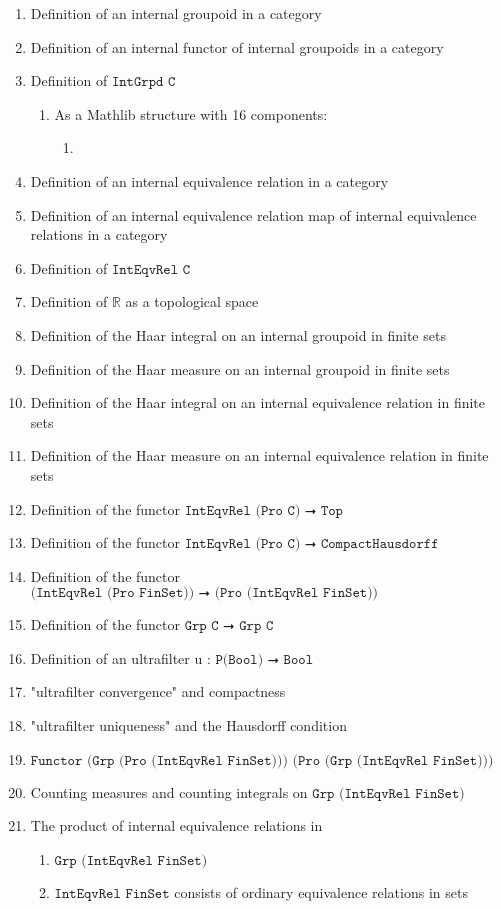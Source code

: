 \documentclass[13pt]{amsart}
\begin{document}
\begin{enumerate}
\item Definition of an internal groupoid in a category
\item Definition of an internal functor of internal groupoids in a category
\item Definition of $\texttt{IntGrpd C}$
\begin{enumerate}
\item As a Mathlib structure with 16 components:
\begin{enumerate}
\item 
\end{enumerate}
\end{enumerate}
\item Definition of an internal equivalence relation in a category
\item Definition of an internal equivalence relation map of internal equivalence relations in a category
\item Definition of $\texttt{IntEqvRel C}$
\item Definition of $\texttt{ℝ}$ as a topological space
\item Definition of the Haar integral on an internal groupoid in finite sets
\item Definition of the Haar measure on an internal groupoid in finite sets
\item Definition of the Haar integral on an internal equivalence relation in finite sets
\item Definition of the Haar measure on an internal equivalence relation in finite sets
\item Definition of the functor $\texttt{IntEqvRel (Pro C) ⭢ Top}$
\item Definition of the functor $\texttt{IntEqvRel (Pro C) ⭢ CompactHausdorff}$
\item Definition of the functor $\texttt{(IntEqvRel (Pro FinSet)) ⭢ (Pro (IntEqvRel FinSet))}$
\item Definition of the functor $\texttt{Grp C ⭢ Grp C}$
\item Definition of an ultrafilter u : $\texttt{P(Bool) ⭢ Bool}$
\item "ultrafilter convergence" and compactness
\item "ultrafilter uniqueness" and the Hausdorff condition
\item $\texttt{Functor (Grp (Pro (IntEqvRel FinSet))) (Pro (Grp (IntEqvRel FinSet)))}$
\item Counting measures and counting integrals on $\texttt{Grp (IntEqvRel FinSet)}$
\item The product of internal equivalence relations in 
\begin{enumerate}
\item $\texttt{Grp (IntEqvRel FinSet)}$
\item $\texttt{IntEqvRel FinSet}$ consists of ordinary equivalence relations in sets
\end{enumerate}
\end{enumerate}
\end{document}
